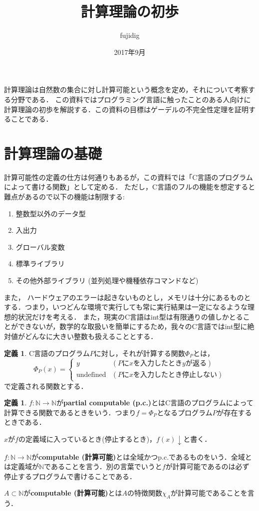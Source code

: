\documentclass[uplatex]{jsarticle}
\newcommand{\N}{\mathbb{N}}
\theoremstyle{definition} %
\newtheorem{defi}[thm]{定義}
\begin{document}
\title{計算理論の初歩}
\author{fujidig}
\date{2017年9月}
\maketitle

計算理論は自然数の集合に対し計算可能という概念を定め，それについて考察する分野である．
この資料ではプログラミング言語に触ったことのある人向けに計算理論の初歩を解説する．この資料の目標はゲーデルの不完全性定理を証明することである．

\section{計算理論の基礎}

計算可能性の定義の仕方は何通りもあるが，この資料では「C言語のプログラムによって書ける関数」として定める．
ただし，C言語のフルの機能を想定すると難点があるので以下の機能は制限する:
\begin{enumerate}
\item 整数型以外のデータ型
\item 入出力
\item グローバル変数
\item 標準ライブラリ
\item その他外部ライブラリ (並列処理や機種依存コマンドなど)
\end{enumerate}
また，	ハードウェアのエラーは起きないものとし，メモリは十分にあるものとする．つまり，いつどんな環境で実行しても常に実行結果は一定になるような理想的状況だけを考える． 
また，現実のC言語はint型は有限通りの値しかとることができないが，数学的な取扱いを簡単にするため，我々のC言語ではint型に絶対値がどんなに大きい整数も扱えることとする．

\begin{defi}
C言語のプログラム$P$に対し，それが計算する関数$\Phi_P$とは，
\[
\Phi_P(x) = 
\begin{cases}
y & (Pにxを入力したときyが返る) \\
\mathrm{undefined} & (Pにxを入力したとき停止しない)
\end{cases}
\]
で定義される関数とする．
\end{defi}

\begin{defi}
$f: \N \to \N$が{\bfseries partial computable (p.c.)}とはC言語のプログラムによって計算できる関数であるときをいう．つまり$f = \Phi_P$となるプログラム$P$が存在するときである．

$x$が$f$の定義域に入っているとき(停止するとき)，$f(x)\downarrow$と書く．

$f: \N \to \N$が{\bfseries computable (計算可能)}とは全域かつp.c.であるものをいう．全域とは定義域が$\N$であることを言う．別の言葉でいうと$f$が計算可能であるのは必ず停止するプログラムで書けることである．

$A \subset \N$が{\bfseries computable (計算可能)}とは$A$の特徴関数$\chi_A$が計算可能であることを言う．
\end{defi}
\end{document}
